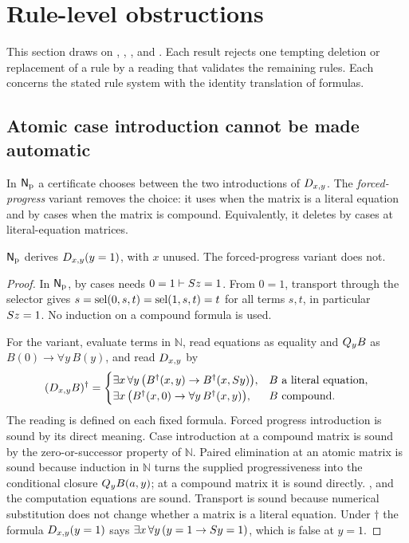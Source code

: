 \section{Rule-level obstructions}
\label{obs:sec:rules}

This section draws on , ,
,  and
. Each result rejects one tempting deletion or
replacement of a rule by a reading that validates the remaining rules. Each
concerns the stated rule system with the identity translation of formulas.

\subsection{Atomic case introduction cannot be made automatic}

In $\mathsf{N}_{\mathrm{p}}$ a certificate chooses between the two introductions of
$D_{x,y}$. The \emph{forced-progress} variant removes the choice: it uses
 when the matrix is a literal equation and 
by cases when the matrix is compound. Equivalently, it deletes 
by cases at literal-equation matrices.

\begin{proposition}
\label{obs:prop:forced-progress}
$\mathsf{N}_{\mathrm{p}}$ derives $D_{x,y}(y=1)$, with $x$ unused. The
forced-progress variant does not.
\end{proposition}

\begin{proof}
In $\mathsf{N}_{\mathrm{p}}$,  by cases needs
$0=1\vdash S z=1$. From $0=1$, transport through the selector gives
$s=\operatorname{sel}(0,s,t)=\operatorname{sel}(1,s,t)=t$ for all terms $s,t$, in particular $S z=1$. No
induction on a compound formula is used.

For the variant, evaluate terms in $\mathbb{N}$, read equations as equality
and $Q_{y}B$ as $B(0)\to\forall y\,B(y)$, and read $D_{x,y}$ by
\[
(D_{x,y}B)^{\dagger}=
\begin{cases}
\exists x\,\forall y\,\bigl(B^{\dagger}(x,y)\to B^{\dagger}(x,S y)\bigr), & B \text{ a literal equation},\\
\exists x\,\bigl(B^{\dagger}(x,0)\to\forall y\,B^{\dagger}(x,y)\bigr), & B \text{ compound}.
\end{cases}
\]
The reading is defined on each fixed formula. Forced progress introduction is
sound by its direct meaning. Case introduction at a compound matrix is sound by
the zero-or-successor property of $\mathbb{N}$. Paired elimination at an atomic
matrix is sound because induction in $\mathbb{N}$ turns the supplied
progressiveness into the conditional closure $Q_{y}B(a,y)$; at a compound
matrix it is sound directly. ,  and the computation
equations are sound. Transport is sound because numerical substitution does not
change whether a matrix is a literal equation. Under $\dagger$ the formula
$D_{x,y}(y=1)$ says $\exists x\,\forall y\,(y=1\to S y=1)$, which is false
at $y=1$.
\end{proof}

